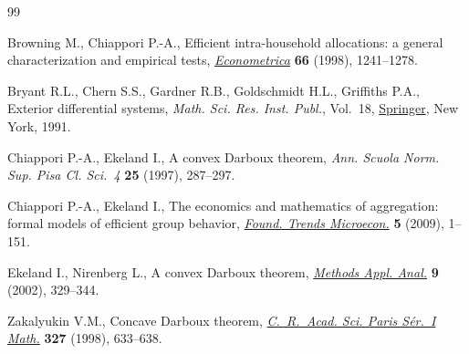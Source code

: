 \documentclass[10pt,a4paper]{amsart}
\numberwithin{equation}{section}
\begin{document}

\begin{thebibliography}{99}
\footnotesize\itemsep=0pt

Browning M., Chiappori P.-A., Efficient intra-household allocations: a general
 characterization and empirical tests, \href{https://doi.org/10.2307/2999616}{\textit{Econometrica}} \textbf{66}
 (1998), 1241--1278.

Bryant R.L., Chern S.S., Gardner R.B., Goldschmidt H.L., Griffiths P.A.,
 Exterior differential systems, \textit{Math. Sci. Res. Inst. Publ.}, Vol.~18,
 \href{https://doi.org/10.1007/978-1-4613-9714-4}{Springer}, New York, 1991.

Chiappori P.-A., Ekeland I., A convex {D}arboux theorem, \textit{Ann. Scuola
 Norm. Sup. Pisa Cl. Sci.~4} \textbf{25} (1997), 287--297.

Chiappori P.-A., Ekeland I., The economics and mathematics of aggregation:
 formal models of efficient group behavior, \href{https://doi.org/10.1561/0700000028}{\textit{Found. Trends Microecon.}}
 \textbf{5} (2009), 1--151.

Ekeland I., Nirenberg L., A convex {D}arboux theorem, \href{https://doi.org/10.4310/MAA.2002.v9.n3.a3}{\textit{Methods Appl. Anal.}} \textbf{9} (2002), 329--344.

Zakalyukin V.M., Concave {D}arboux theorem, \href{https://doi.org/10.1016/S0764-4442(99)80092-5}{\textit{C.~R.~Acad. Sci. Paris
 S\'{e}r.~{I} Math.}} \textbf{327} (1998), 633--638.

\end{thebibliography}
\end{document}
